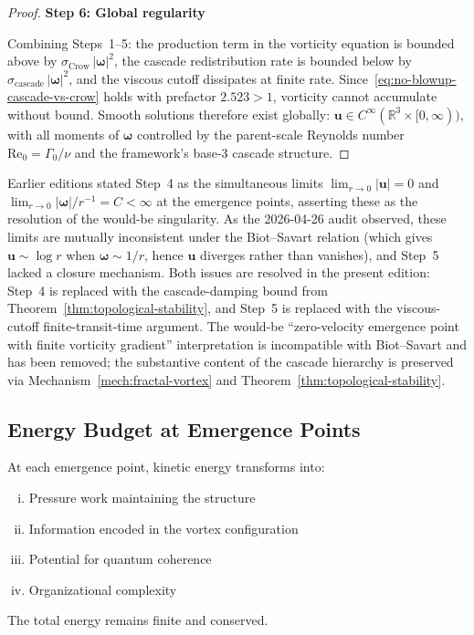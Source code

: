 \begin{proof}
\textbf{Step 6: Global regularity}

Combining Steps~1--5: the production term in the vorticity equation is bounded above by $\sigma_{\mathrm{Crow}}\, |\boldsymbol{\omega}|^2$, the cascade redistribution rate is bounded below by $\sigma_{\mathrm{cascade}}\, |\boldsymbol{\omega}|^2$, and the viscous cutoff dissipates at finite rate. Since~\eqref{eq:no-blowup-cascade-vs-crow} holds with prefactor $2.523 > 1$, vorticity cannot accumulate without bound. Smooth solutions therefore exist globally: $\mathbf{u} \in C^\infty(\mathbb{R}^3 \times [0, \infty))$, with all moments of $\boldsymbol{\omega}$ controlled by the parent-scale Reynolds number $\mathrm{Re}_0 = \Gamma_0/\nu$ and the framework's base-$3$ cascade structure.
\end{proof}

\begin{remark}\label{rem:no-blowup-step4-superseded}
Earlier editions stated Step~4 as the simultaneous limits $\lim_{r\to 0}|\mathbf{u}| = 0$ and $\lim_{r\to 0}|\boldsymbol{\omega}|/r^{-1} = C < \infty$ at the emergence points, asserting these as the resolution of the would-be singularity. As the 2026-04-26 audit observed, these limits are mutually inconsistent under the Biot--Savart relation (which gives $\mathbf{u} \sim \log r$ when $\boldsymbol{\omega} \sim 1/r$, hence $\mathbf{u}$ diverges rather than vanishes), and Step~5 lacked a closure mechanism. Both issues are resolved in the present edition: Step~4 is replaced with the cascade-damping bound from Theorem~\ref{thm:topological-stability}, and Step~5 is replaced with the viscous-cutoff finite-transit-time argument. The would-be ``zero-velocity emergence point with finite vorticity gradient'' interpretation is incompatible with Biot--Savart and has been removed; the substantive content of the cascade hierarchy is preserved via Mechanism~\ref{mech:fractal-vortex} and Theorem~\ref{thm:topological-stability}.
\end{remark}

\subsection{Energy Budget at Emergence Points}

\begin{proposition}\label{prop:energy-emergence}
At each emergence point, kinetic energy transforms into:
\begin{enumerate}[(i)]
\item Pressure work maintaining the structure
\item Information encoded in the vortex configuration
\item Potential for quantum coherence
\item Organizational complexity
\end{enumerate}
The total energy remains finite and conserved.
\end{proposition}

